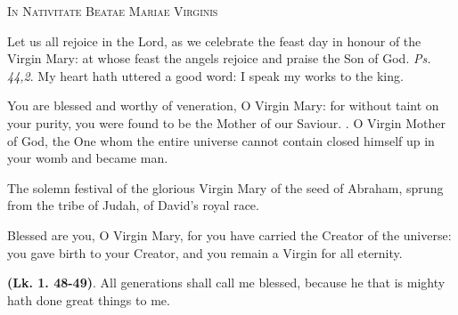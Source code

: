 \documentclass[11pt]{article} %
\begin{document}
\begin{center}\begin{huge}
  \textsc{In Nativitate Beatae Mariae Virginis}
\end{huge}\end{center}

\def\greinitialformat#1{%
  {\fontsize{34}{34}\selectfont #1}%
}


Let us all rejoice in the Lord, as we celebrate the feast day in honour of the
Virgin Mary: at whose feast the angels rejoice and praise the Son of God.
\emph{Ps. 44,2}. My heart hath uttered a good word: I speak my works to the
king.

\vskip10pt


You are blessed and worthy of veneration, O Virgin Mary: for without taint on
your purity, you were found to be the Mother of our Saviour. \Vbar{}. O Virgin
Mother of God, the One whom the entire universe cannot contain closed himself up
in your womb and became man.

\vskip10pt


The solemn festival of the glorious Virgin Mary of the seed of Abraham, sprung
from the tribe of Judah, of David's royal race.

\vskip10pt


Blessed are you, O Virgin Mary, for you have carried the Creator of the
universe: you gave birth to your Creator, and you remain a Virgin for all
eternity.

\vskip10pt


\textbf{(Lk. 1. 48-49)}. All generations shall call me blessed, because he that
is mighty hath done great things to me.
\end{document}
